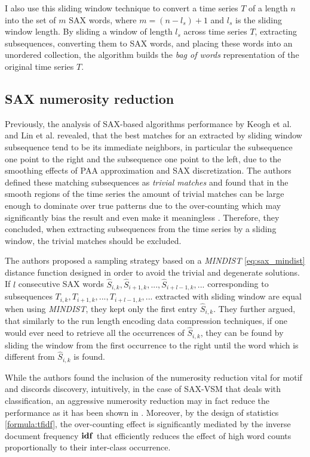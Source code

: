 I also use this sliding window technique to convert a time series $T$ of a length $n$ into 
the set of $m$ SAX words, where $m=(n-l_{s})+1$ and $l_{s}$ is the sliding window length. 
By sliding a window of length $l_{s}$ across time series $T$, extracting subsequences, 
converting them to SAX words, and placing these words into an unordered collection, 
the algorithm builds the \textit{bag of words} representation of the original time series $T$.

\subsection{SAX numerosity reduction}\label{section_numerosity_reduction}
Previously, the analysis of SAX-based algorithms performance by Keogh et al. \cite{citeulike:3977965} and 
Lin et al. \cite{citeulike:3175749} revealed, that the best matches for an extracted by sliding window 
subsequence tend to be its immediate neighbors, in particular the subsequence one point to the 
right and the subsequence one point to the left, due to the smoothing effects of PAA approximation and SAX discretization. 
The authors defined these matching subsequences as \textit{trivial matches} and found that in the smooth 
regions of the time series the amount of trivial matches can be large enough to dominate over true patterns due to 
the over-counting which may significantly bias the result and even make it meaningless \cite{citeulike:227029}. 
Therefore, they concluded, when extracting subsequences from the time series by a sliding window, the trivial 
matches should be excluded. 

The authors proposed a sampling strategy based on a \textit{MINDIST} \eqref{eq:sax_mindist} distance 
function designed in order to avoid the trivial and degenerate solutions.
If $l$ consecutive SAX words \newline $\widehat{S}_{i,k}, \widehat{S}_{i+1,k},...,\widehat{S}_{i+l-1,k},...$
corresponding to subsequences $T_{i,k}, T_{i+1,k},...,T_{i+l-1,k},...$ extracted with sliding window are 
equal when using \textit{MINDIST}, they kept only the first entry $\widehat{S}_{i,k}$. 
They further argued, that similarly to the run length encoding data compression techniques, if one would 
ever need to retrieve all the occurrences of $\widehat{S}_{i,k}$, they can be found by sliding the window from 
the first occurrence to the right until the word which is different from $\widehat{S}_{i,k}$ is found. 

While the authors found the inclusion of the numerosity reduction vital for motif and discords discovery, 
intuitively, in the case of SAX-VSM that deals with classification, an aggressive numerosity reduction may 
in fact reduce the performance as it has been shown in \cite{citeulike:10525778}. 
Moreover, by the design of \tfidf statistics \eqref{formula:tfidf}, the over-counting effect is significantly mediated 
by the inverse document frequency $\text{\textbf{idf}}$ that efficiently reduces the effect of high word counts 
proportionally to their inter-class occurrence.

